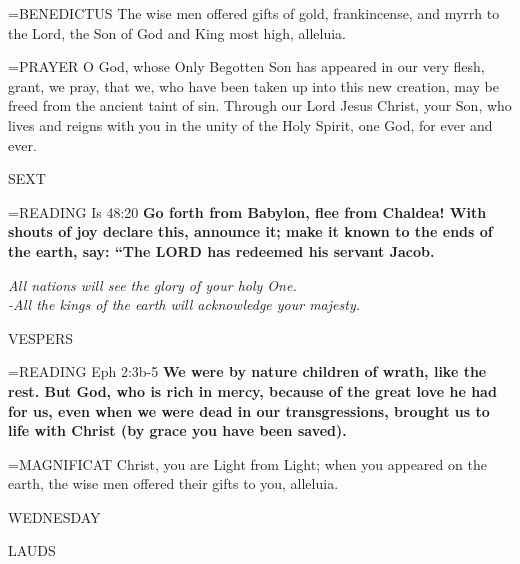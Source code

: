 \hangindent=\parindent \small{BENEDICTUS 	The wise men offered gifts of gold, frankincense, and myrrh to the Lord, the Son of God and King most high, alleluia.\\}

\hangindent=\parindent \small{PRAYER 	O God, whose Only Begotten Son has appeared in our very flesh, grant, we pray, that we, who have been taken up into this new creation, may be freed from the ancient taint of sin. Through our Lord Jesus Christ, your Son, who lives and reigns with you in the unity of the Holy Spirit, one God, for ever and ever.}

\begin{flushleft}\normalsize SEXT\\\end{flushleft}

\hangindent=\parindent \small{READING}   Is 48:20 \textbf{  Go forth from Babylon, flee from Chaldea! With shouts of joy declare this, announce it; make it known to the ends of the earth, say: “The LORD has redeemed his servant Jacob.}

\begin{center}
\textit{All nations will see the glory of your holy One.\\
-All the kings of the earth will acknowledge your majesty.}
\end{center}

\begin{flushleft}\normalsize VESPERS\\\end{flushleft}

\hangindent=\parindent \small{READING}   Eph 2:3b-5 \textbf{  We were by nature children of wrath, like the rest. But God, who is rich in mercy, because of the great love he had for us, even when we were dead in our transgressions, brought us to life with Christ (by grace you have been saved).\\}

\hangindent=\parindent \small{MAGNIFICAT 	Christ, you are Light from Light; when you appeared on the earth, the wise men offered their gifts to you, alleluia.\\}

\begin{center}
\normalsize WEDNESDAY
\end{center}

\begin{flushleft}\normalsize LAUDS\\\end{flushleft}

